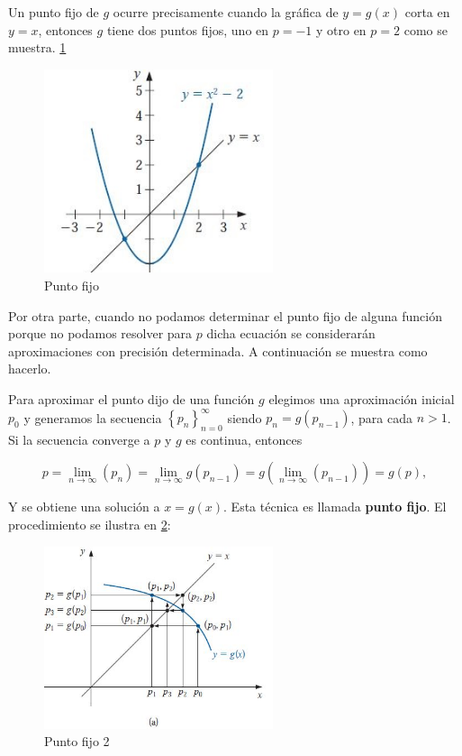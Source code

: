 Un punto fijo de $g$ ocurre precisamente cuando la gráfica de $y=g(x)$ corta en $y=x$, entonces $g$ tiene dos puntos fijos, uno en $p=-1$ y otro en $p=2$ como se muestra. \ref{tab:fig}

\begin{figure}[h!]
\centering
  \includegraphics[width=0.6\textwidth]{Puntofijo.JPG}
\caption{Punto fijo}
\label{tab:fig}
\end{figure} 


Por otra parte, cuando no podamos determinar el punto fijo de alguna función porque no podamos resolver para $p$ dicha ecuación se considerarán aproximaciones con precisión determinada. A continuación se muestra como hacerlo.

Para aproximar el punto dijo de una función $g$ elegimos una aproximación inicial $p_0$ y generamos la secuencia $\left\lbrace p_n\right\rbrace ^\infty_{n=0}$ siendo $p_n=g(p_{n-1})$, para cada $n>1$. Si la secuencia converge a $p$ y $g$ es continua, entonces

\begin{equation*}
    p = \lim_{n \to \infty}(p_n)=\lim_{n \to \infty}g(p_{n-1})=g\left(\lim_{n \to \infty}(p_{n-1})\right)=g(p),
\end{equation*}

Y se obtiene una solución a $x=g(x)$. Esta técnica es llamada \textbf{punto fijo}. El procedimiento se ilustra en \ref{tab:fig2}:

\begin{figure}[h!]
\centering
  \includegraphics[width=0.6\textwidth]{Puntofijo2.JPG}
\caption{Punto fijo 2}
\label{tab:fig2}
\end{figure} 

